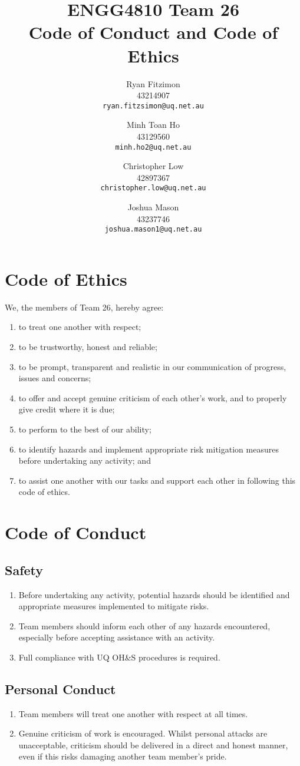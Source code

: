 \documentclass[a4paper]{article}
\title{\vspace{-2cm}ENGG4810 Team 26\\
	Code of Conduct and Code of Ethics\vspace{1cm}}
\author{Ryan Fitzimon\\
	43214907\\
	\texttt{ryan.fitzsimon@uq.net.au}
	\and
	Minh Toan Ho\\
	43129560\\
	\texttt{minh.ho2@uq.net.au}
	\and
	Christopher Low\\
	42897367\\
	\texttt{christopher.low@uq.net.au}
	\and
	Joshua Mason\\
	43237746\\
	\texttt{joshua.mason1@uq.net.au}
	\vspace{1cm}
}
\begin{document}
\maketitle
\vspace{1cm}

\section{Code of Ethics}
We, the members of Team 26, hereby agree:
\begin{enumerate}
	\item to treat one another with respect;
	\item to be trustworthy, honest and reliable;
	\item to be prompt, transparent and realistic in our communication of progress, issues and concerns;
	\item to offer and accept genuine criticism of each other's work, and to properly give credit where it is due;
	\item to perform to the best of our ability;
	\item to identify hazards and implement appropriate risk mitigation measures before undertaking any activity; and
	\item to assist one another with our tasks and support each other in following this code of ethics.
\end{enumerate}

\pagebreak
\section{Code of Conduct}

\subsection{Safety}
\begin{enumerate}[label=(\alph*)]
	\item Before undertaking any activity, potential hazards should be identified and appropriate measures implemented to mitigate risks.
	\item Team members should inform each other of any hazards encountered, especially before accepting assistance with an activity.
	\item Full compliance with UQ OH\&S procedures is required.
\end{enumerate}

\subsection{Personal Conduct}
\begin{enumerate}[label=(\alph*)]
	\item Team members will treat one another with respect at all times.
	\item Genuine criticism of work is encouraged. Whilst personal attacks are unacceptable, criticism should be delivered in a direct and honest manner, even if this risks damaging another team member's pride.
	
\end{enumerate}
\end{document}
